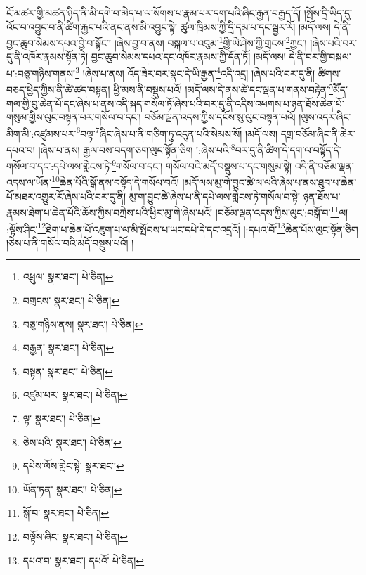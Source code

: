 ངོ་མཚར་གྱི་མཚན་ཉིད་ནི་མི་དགེ་བ་མེད་པ་ལ་སོགས་པ་རྣམ་པར་དག་པའི་ཞིང་རྒྱན་བརྒྱད་དོ། །སྤོས་དྲི་ཡིད་དུ་འོང་བ་འབྱུང་བ་ནི་ཚིག་རྐྱང་པའི་ནང་ནས་མི་འབྱུང་སྟེ། ཚུལ་ཁྲིམས་ཀྱི་དྲི་དམ་པ་དང་སྦྱར་རོ། །མདོ་ལས། དེ་ནི་བྱང་ཆུབ་སེམས་དཔའ་བྱེ་བ་སྟོང་། །ཞེས་བྱ་བ་ནས། བསྐལ་པ་འབུམ་\footnote{འཕྲུལ་  སྣར་ཐང་།  པེ་ཅིན། }གྱི་ཡེ་ཤེས་ཀྱི་གྲངས་\footnote{བགྲངས་  སྣར་ཐང་།  པེ་ཅིན། }ཀྱང་། །ཞེས་པའི་བར་དུ་ནི་འཁོར་རྣམས་སྟོན་ཏེ། བྱང་ཆུབ་སེམས་དཔའ་དང་འཁོར་རྣམས་ཀྱི་དོན་ཏོ། །མདོ་ལས། དེ་ནི་བར་གྱི་བསྐལ་པ་:བཅུ་གཉིས་གནས།\footnote{བཅུ་གཉིས་ནས།  སྣར་ཐང་།  པེ་ཅིན། } །ཞེས་པ་ནས། འོད་ཟེར་བར་སྣང་དེ་ཡི་རྒྱན་\footnote{བརྒྱན་  སྣར་ཐང་།  པེ་ཅིན། }འདི་འདྲ། །ཞེས་པའི་བར་དུ་ནི། ཚིགས་བཅད་ཕྱེད་ཀྱིས་ནི་ཚེ་ཚད་བསྟན། ཕྱི་མས་ནི་བསྡུས་པའོ། །མདོ་ལས་དེ་ནས་ཚེ་དང་ལྡན་པ་གནས་བརྟེན་\footnote{བསྟན་  སྣར་ཐང་།  པེ་ཅིན། }མཽད་གལ་གྱི་བུ་ཆེན་པོ་དང་ཞེས་པ་ནས་འདི་སྐད་གསོལ་ཏོ་ཞེས་པའི་བར་དུ་ནི་འདིས་འཕགས་པ་ཉན་ཐོས་ཆེན་པོ་གསུམ་གྱིས་ལུང་བསྟན་པར་གསོལ་བ་དང་། བཅོམ་ལྡན་འདས་ཀྱིས་དངོས་སུ་ལུང་བསྟན་པའོ། །ལུས་འདར་ཞིང་མིག་མི་:འཛུམས་པར་\footnote{འཛུམ་པར་  སྣར་ཐང་།  པེ་ཅིན། }བལྟ་\footnote{ལྟ་  སྣར་ཐང་།  པེ་ཅིན། }ཞིང་ཞེས་པ་ནི་གཅིག་ཏུ་འདུན་པའི་སེམས་སོ། །མདོ་ལས། དགྲ་བཅོམ་ཞིང་ནི་ཆེར་དཔའ་བ། །ཞེས་པ་ནས། རྒྱལ་བས་བདག་ཅག་ལུང་སྟོན་ཅིག །:ཞེས་པའི་\footnote{ཅེས་པའི་  སྣར་ཐང་།  པེ་ཅིན། }བར་དུ་ནི་ཚིག་དེ་དག་ལ་བསྟོད་དེ་གསོལ་བ་དང་:དཔེ་ལས་གླེངས་ཏེ་\footnote{དཔེས་ལོས་གླེང་སྟེ་  སྣར་ཐང་། }གསོལ་བ་དང་། གསོལ་བའི་མདོ་བསྡུས་པ་དང་གསུམ་སྟེ། འདི་ནི་བཅོམ་ལྡན་འདས་ལ་ཡོན་\footnote{ཡོན་ཏན་  སྣར་ཐང་།  པེ་ཅིན། }ཆེན་པོའི་སྒོ་ནས་བསྟོད་དེ་གསོལ་བའོ། །མདོ་ལས་མུ་གེ་བྱུང་ཚེ་ལ་ལའི་ཞེས་པ་ནས་ཐུབ་པ་ཆེན་པོ་མཐར་འགྱུར་རོ་ཞེས་པའི་བར་དུ་ནི། མུ་ག་བྱུང་ཚེ་ཞེས་པ་ནི་དཔེ་ལས་གླེངས་ཏེ་གསོལ་བ་སྟེ། ཉན་ཐོས་པ་རྣམས་ཐེག་པ་ཆེན་པོའི་ཆོས་ཀྱིས་བཀྲེས་པའི་ཕྱིར་མུ་གེ་ཞེས་པའོ། །བཅོམ་ལྡན་འདས་ཀྱིས་ལུང་:བསྒོ་བ་\footnote{སྒོ་བ་  སྣར་ཐང་།  པེ་ཅིན། }ལ། :ལྟོས་ཤིང་\footnote{བལྟོས་ཞིང་  སྣར་ཐང་།  པེ་ཅིན། }ཐེག་པ་ཆེན་པོ་འཇུག་པ་ལ་མི་སྤོབས་པ་ཡང་དཔེ་དེ་དང་འདྲའོ། །:དཔའ་བོ་\footnote{དཔའ་བ་  སྣར་ཐང་། དཔའོ་  པེ་ཅིན། }ཆེན་པོས་ལུང་སྟོན་ཅིག །ཅེས་པ་ནི་གསོལ་བའི་མདོ་བསྡུས་པའོ། །
